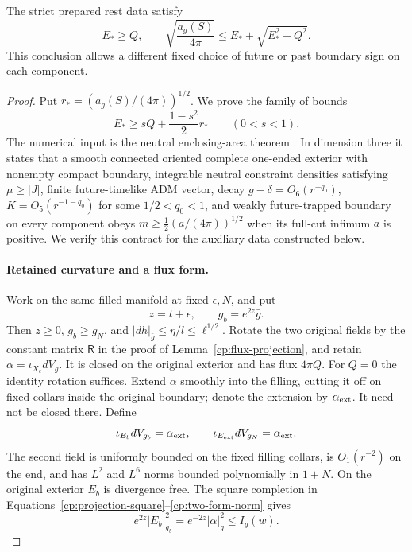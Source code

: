 \begin{proposition}
\label{cp:numerical-prepared}
The strict prepared rest data satisfy
\begin{equation}\label{cp:prepared-inequality}
 E_*\ge Q,
 \qquad
 \sqrt{\frac{a_g(S)}{4\pi}}
      \le E_*+\sqrt{E_*^2-Q^2}.
\end{equation}
This conclusion allows a different fixed choice of future or past
boundary sign on each component.
\end{proposition}

\begin{proof}
Put $r_*=(a_g(S)/(4\pi))^{1/2}$.  We prove the family of bounds
\begin{equation}\label{cp:flux-family}
 E_*\ge sQ+\frac{1-s^2}{2}r_*\qquad(0<s<1).
\end{equation}
The numerical input is the neutral enclosing-area theorem
\cite[Definitions~1.1--1.2 and Theorem~1.3]{NeutralEnclosingArea2026}.
In dimension three it states that a smooth connected oriented complete
one-ended exterior with nonempty compact boundary, integrable neutral
constraint densities satisfying $\mu\ge|J|$, finite future-timelike ADM
vector, decay $g-\delta=O_6(r^{-q_0})$, $K=O_5(r^{-1-q_0})$ for some
$1/2<q_0<1$, and weakly future-trapped boundary on every component obeys
$m\ge\tfrac12(a/(4\pi))^{1/2}$ when its full-cut infimum $a$ is positive.
We verify this contract for the auxiliary data constructed below.

\paragraph{Retained curvature and a flux form.}
Work on the same filled manifold at fixed $\epsilon,N$, and put
\[
 z=t+\epsilon,\qquad g_b=e^{2z}\bar g.
\]
Then $z\ge0$, $g_b\ge g_N$, and
$|dh|_{\bar g}\le\eta/l\le\ell^{1/2}$.  Rotate the two original
fields by the constant matrix $\mathsf R$ in the proof of
Lemma~\ref{cp:flux-projection}, and retain
$\alpha=\iota_{X_e}dV_g$.  It is closed on the original exterior and
has flux $4\pi Q$.  For $Q=0$ the identity rotation suffices.
Extend $\alpha$ smoothly into the filling, cutting it off on fixed
collars inside the original boundary; denote the extension by
$\alpha_{\rm ext}$.  It need not be closed there.  Define
\[
 \iota_{E_b}dV_{g_b}=\alpha_{\rm ext},\qquad
 \iota_{E_{\rm ext}}dV_{g_N}=\alpha_{\rm ext}.
\]
The second field is uniformly bounded on the fixed filling collars,
is $O_1(r^{-2})$ on the end, and has $L^2$ and $L^6$ norms bounded
polynomially in $1+N$.  On the original exterior $E_b$ is divergence
free.  The square completion in
Equations~\eqref{cp:projection-square}--\eqref{cp:two-form-norm} gives
\[
 e^{2z}|E_b|_{g_b}^2=e^{-2z}|\alpha|_{\bar g}^2
 \le I_g(w).
\]


\end{proof}
